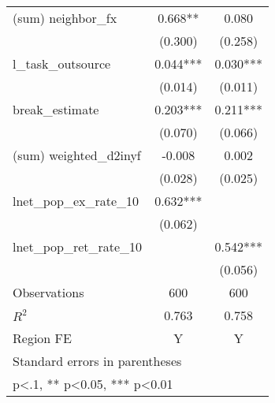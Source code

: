 \begin{table}[htbp]
\begin{tabular}{l*{2}{c}}
\addlinespace
(sum) neighbor\_fx   &    0.668** &    0.080   \\
                    &  (0.300)   &  (0.258)   \\
\addlinespace
l\_task\_outsource    &    0.044***&    0.030***\\
                    &  (0.014)   &  (0.011)   \\
\addlinespace
break\_estimate      &    0.203***&    0.211***\\
                    &  (0.070)   &  (0.066)   \\
\addlinespace
(sum) weighted\_d2inyf&   -0.008   &    0.002   \\
                    &  (0.028)   &  (0.025)   \\
\addlinespace
lnet\_pop\_ex\_rate\_10 &    0.632***&            \\
                    &  (0.062)   &            \\
\addlinespace
lnet\_pop\_ret\_rate\_10&            &    0.542***\\
                    &            &  (0.056)   \\
\midrule
Observations        &      600   &      600   \\
\(R^{2}\)           &    0.763   &    0.758   \\
Region FE           &        Y   &        Y   \\
\bottomrule
\multicolumn{3}{l}{\footnotesize Standard errors in parentheses}\\
\multicolumn{3}{l}{\footnotesize * p<.1, ** p<0.05, *** p<0.01}\\
\end{tabular}
\end{table}
